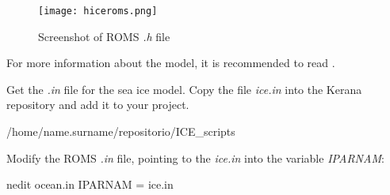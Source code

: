 \begin{figure}[H]
    \centering
    \texttt{[image: hiceroms.png]}
    \caption{Screenshot of ROMS \textit{.h} file}
    \label{hiceroms}
\end{figure}
\bigskip

\noindent For more information about the model, it is recommended to read \textcite{hedstrom2018}.
\bigskip

\noindent Get the \textit{.in} file for the sea ice model. Copy the file \textit{ice.in} into the Kerana repository and add it to your project.
\bigskip

\begin{bashcode}
    /home/name.surname/repositorio/ICE_scripts
\end{bashcode}
\bigskip
    
\noindent Modify the ROMS \textit{.in} file, pointing to the \textit{ice.in} into the variable \textit{IPARNAM}:
\bigskip

\begin{bashcode}
nedit ocean.in
IPARNAM =  ice.in
\end{bashcode}